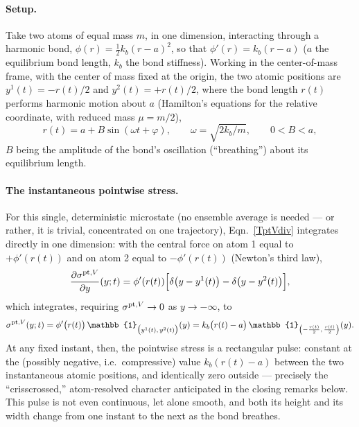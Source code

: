 \paragraph{Setup.} Take two atoms of equal mass $m$, in one dimension, interacting through a harmonic bond, $\phi(r)=\tfrac12k_b(r-a)^2$, so that $\phi'(r)=k_b(r-a)$ ($a$ the equilibrium bond length, $k_b$ the bond stiffness). Working in the center-of-mass frame, with the center of mass fixed at the origin, the two atomic positions are $y^1(t)=-r(t)/2$ and $y^2(t)=+r(t)/2$, where the bond length $r(t)$ performs harmonic motion about $a$ (Hamilton's equations for the relative coordinate, with reduced mass $\mu=m/2$),
\begin{equation}\label{bondmotion}
	r(t) = a + B\sin(\omega t+\varphi), \qquad \omega=\sqrt{2k_b/m}, \qquad 0<B<a,
\end{equation}
$B$ being the amplitude of the bond's oscillation (``breathing'') about its equilibrium length.

\paragraph{The instantaneous pointwise stress.} For this single, deterministic microstate (no ensemble average is needed --- or rather, it is trivial, concentrated on one trajectory), Eqn.~\eqref{TptVdiv} integrates directly in one dimension: with the central force on atom 1 equal to $+\phi'(r(t))$ and on atom 2 equal to $-\phi'(r(t))$ (Newton's third law),
\begin{equation}
	\frac{\partial\sigma^{{\rm pt},V}}{\partial y}(y;t) = \phi'(r(t))\Big[\delta\big(y-y^1(t)\big) - \delta\big(y-y^2(t)\big)\Big],
\end{equation}
which integrates, requiring $\sigma^{{\rm pt},V}\to0$ as $y\to-\infty$, to
\begin{equation}\label{instpulse}
	\sigma^{{\rm pt},V}(y;t) = \phi'\big(r(t)\big)\,\mathbb{1}_{\big(y^1(t),\,y^2(t)\big)}(y) = k_b\big(r(t)-a\big)\,\mathbb{1}_{\left(-\frac{r(t)}2,\,\frac{r(t)}2\right)}(y).
\end{equation}
At any fixed instant, then, the pointwise stress is a rectangular pulse: constant at the (possibly negative, i.e.\ compressive) value $k_b(r(t)-a)$ between the two instantaneous atomic positions, and identically zero outside --- precisely the ``crisscrossed,'' atom-resolved character anticipated in the closing remarks below. This pulse is not even continuous, let alone smooth, and both its height and its width change from one instant to the next as the bond breathes.

